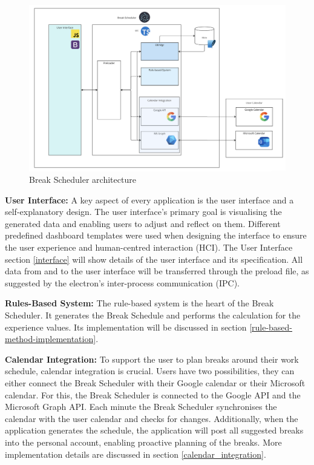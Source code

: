\documentclass{hasel_thesis}
\begin{document}
\begin{figure}[htp]
    \centering
    \includegraphics[width=14cm]{hasel_thesis/images/architectur.png}
    \caption{Break Scheduler architecture}
    \label{fig:architectur}
\end{figure}


\textbf{User Interface:} A key aspect of every application is the user interface and a self-explanatory design. The user interface's primary goal is visualising the generated data and enabling users to adjust and reflect on them. Different predefined dashboard templates were used when designing the interface to ensure the user experience and human-centred interaction (HCI). The User Interface section \ref{interface} will show details of the user interface and its specification. All data from and to the user interface will be transferred through the preload file, as suggested by the electron's inter-process communication (IPC).


\textbf{Rules-Based System:} The rule-based system is the heart of the Break Scheduler. It generates the Break Schedule and performs the calculation for the experience values. Its implementation will be discussed in section \ref{rule-based-method-implementation}.


\textbf{Calendar Integration:} To support the user to plan breaks around their work schedule, calendar integration is crucial. Users have two possibilities, they can either connect the Break Scheduler with their Google calendar or their Microsoft calendar. For this, the Break Scheduler is connected to the Google API and the Microsoft Graph API. Each minute the Break Scheduler synchronises the calendar with the user calendar and checks for changes. Additionally, when the application generates the schedule, the application will post all suggested breaks into the personal account, enabling proactive planning of the breaks. More implementation details are discussed in section \ref{calendar_integration}.
\end{document}

